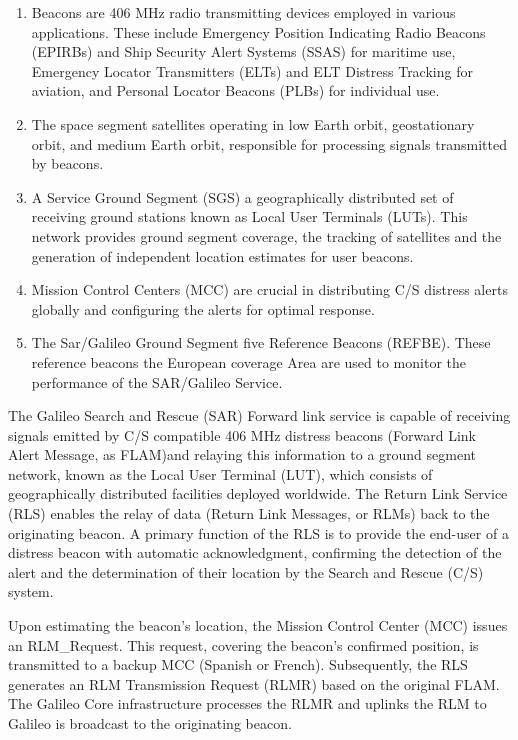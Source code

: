 \begin{enumerate}
    \item Beacons are 406 MHz radio transmitting devices employed in various applications. These include Emergency Position Indicating Radio Beacons (EPIRBs) and Ship Security Alert Systems (SSAS) for maritime use, Emergency Locator Transmitters (ELTs) and ELT Distress Tracking for aviation, and Personal Locator Beacons (PLBs) for individual use.

    \item The space segment  satellites operating in low Earth orbit, geostationary orbit, and medium Earth orbit, responsible for processing signals transmitted by beacons.

    \item A Service Ground Segment (SGS)  a geographically distributed set of receiving ground stations known as Local User Terminals (LUTs). This network provides ground segment coverage,  the tracking of satellites and the generation of independent location estimates for user beacons.

    \item Mission Control Centers (MCC) are crucial in distributing C/S distress alerts globally and configuring the alerts for optimal response.

    \item The Sar/Galileo Ground Segment  five Reference Beacons (REFBE). These reference beacons  the European coverage Area are used to monitor the performance of the SAR/Galileo Service.
\end{enumerate}

The Galileo Search and Rescue (SAR) Forward link service is capable of receiving signals emitted by C/S compatible 406 MHz distress beacons (Forward Link Alert Message, as FLAM)and relaying this information to a ground segment network, known as the Local User Terminal (LUT), which consists of geographically distributed facilities deployed worldwide. The Return Link Service (RLS) enables the relay of data (Return Link Messages, or RLMs) back to the originating beacon. A primary function of the RLS is to provide the end-user of a distress beacon with automatic acknowledgment, confirming the detection of the alert and the determination of their location by the Search and Rescue (C/S) system.

Upon estimating the beacon's location, the Mission Control Center (MCC) issues an RLM\_Request. This request, covering the beacon's confirmed position, is transmitted to a backup MCC (Spanish or French). Subsequently, the RLS generates an RLM Transmission Request (RLMR) based on the original FLAM. The Galileo Core infrastructure processes the RLMR and uplinks the RLM to  Galileo  is broadcast to the originating beacon.

